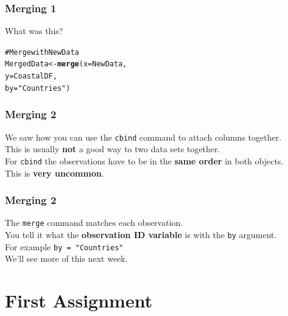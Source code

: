 \documentclass{beamer}\usepackage{graphicx, color}
\makeatletter
\newcommand{\hlfunctioncall}[1]{\textcolor[rgb]{0.501960784313725,0,0.329411764705882}{\textbf{#1}}}%
\newcommand{\hlstring}[1]{\textcolor[rgb]{0.6,0.6,1}{#1}}%
\newcommand{\hlcomment}[1]{\textcolor[rgb]{0.180392156862745,0.6,0.341176470588235}{#1}}%
\newenvironment{kframe}{%
 \def\at@end@of@kframe{}%
 \ifinner\ifhmode%
  \def\at@end@of@kframe{\end{minipage}}%
  \begin{minipage}{\columnwidth}%
 \fi\fi%
 \def\FrameCommand##1{\hskip\@totalleftmargin \hskip-\fboxsep
 \colorbox{shadecolor}{##1}\hskip-\fboxsep
     \hskip-\linewidth \hskip-\@totalleftmargin \hskip\columnwidth}%
 \MakeFramed {\advance\hsize-\width
   \@totalleftmargin\z@ \linewidth\hsize
   \@setminipage}}%
 {\par\unskip\endMakeFramed%
 \at@end@of@kframe}
\newenvironment{knitrout}{}{} %
\makeatother
\begin{document}
\begin{frame}[fragile]
  \frametitle{Merging 1}
  What was this?
\begin{knitrout}
\color{fgcolor}\begin{kframe}
\begin{alltt}
\hlcomment{# Merge with NewData}
MergedData <- \hlfunctioncall{merge}(x = NewData, 
                    y = CoastalDF, 
                    by = \hlstring{"Countries"})
\end{alltt}
\end{kframe}
\end{knitrout}

\end{frame}

\begin{frame}[fragile]
  \frametitle{Merging 2}
  We saw how you can use the \texttt{cbind} command to attach columns together. \\[0.5cm]
  This is usually {\bf{not}} a good way to two data sets together. \\[0.5cm]
  For \texttt{cbind} the observations have to be in the {\bf{same order}} in both objects. \\[0.5cm]
  This is {\bf{very uncommon}}.
\end{frame}

\begin{frame}[fragile]
  \frametitle{Merging 2}
  The \texttt{merge} command matches each observation.\\[0.5cm]
  You tell it what the {\bf{observation ID variable}} is with the \texttt{by} argument.\\[0.25cm]
  For example \texttt{by = "Countries"} \\[0.5cm]
  We'll see more of this next week.
\end{frame}


\section{First Assignment}
\end{document}

